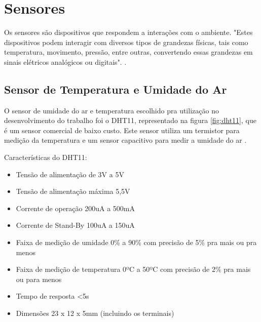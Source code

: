 
\section{Sensores}

Os sensores são dispositivos que respondem a interações com o ambiente. "Estes dispositivos podem interagir com diversos tipos de grandezas físicas, tais como temperatura, movimento, pressão, entre outras, convertendo essas grandezas em sinais elétricos analógicos ou digitais". \cite{marchesan2012sensores}.

\subsection{Sensor de Temperatura e Umidade do Ar}

O sensor de umidade do ar e temperatura escolhido pra utilização no desenvolvimento do trabalho foi o DHT11, representado na figura \ref{fig:dht11}, que é um sensor comercial de baixo custo. Este sensor utiliza um termistor para medição da temperatura e um sensor capacitivo para medir a umidade do ar \cite{gay2014dht11}.

Características do DHT11:
\begin{itemize}[itemsep=0em]
\item Tensão de alimentação de 3V a 5V
\item Tensão de alimentação máxima 5,5V
\item Corrente de operação 200uA a 500mA
\item Corrente de Stand-By 100uA a 150uA
\item Faixa de medição de umidade 0\% a 90\% com precisão de 5\%
 pra mais ou pra menos
\item Faixa de medição de temperatura 0ºC a 50ºC com precisão de 2\% pra mais ou para menos
\item Tempo de resposta <5s
\item Dimensões 23 x 12 x 5mm (incluindo os terminais)
\end{itemize}

